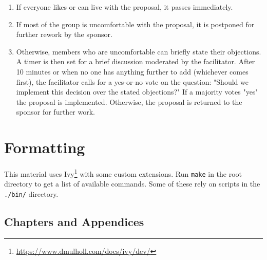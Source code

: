 \documentclass[krantzl]{krantz}
\newcommand{\hreffoot}[2]{{#1}\footnote{\href{#2}{#2}}}
\begin{document}
\begin{enumerate}
\begin{itemize}
\end{itemize}



\item 

If everyone likes or can live with the proposal, it passes immediately.



\item 

If most of the group is uncomfortable with the proposal, it is postponed for
    further rework by the sponsor.



\item 

Otherwise, members who are uncomfortable can briefly state their objections.
    A timer is then set for a brief discussion moderated by the facilitator.
    After 10 minutes or when no one has anything further to add (whichever comes
    first), the facilitator calls for a yes-or-no vote on the question: "Should
    we implement this decision over the stated objections?"  If a majority votes
    "yes" the proposal is implemented.  Otherwise, the proposal is returned to
    the sponsor for further work.



\end{enumerate}

\section*{Formatting}


This material uses \hreffoot{Ivy}{https://www.dmulholl.com/docs/ivy/dev/} with some custom extensions.
Run \texttt{make} in the root directory to get a list of available commands.
Some of these rely on scripts in the \texttt{./bin/} directory.

\subsection*{Chapters and Appendices}
\end{document}
